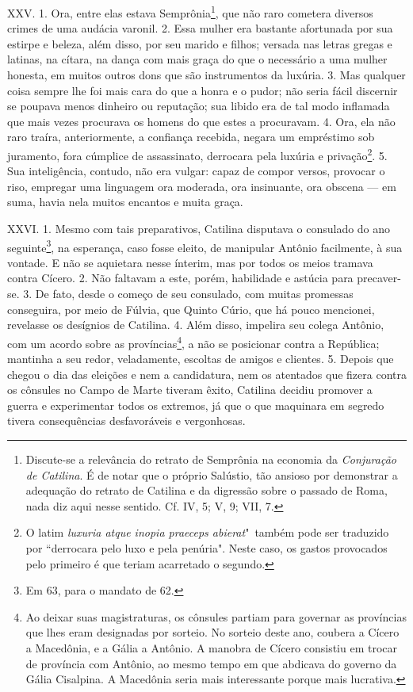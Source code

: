 XXV. 1. Ora, entre elas estava Semprônia\footnote{Discute-se a relevância do
retrato de Semprônia na economia da \emph{Conjuração de Catilina}. É de notar
que o próprio Salústio, tão ansioso por demonstrar a adequação do retrato de
Catilina e da digressão sobre o passado de Roma, nada diz aqui nesse sentido.
Cf. IV, 5; V, 9; VII, 7.}, que não raro cometera diversos crimes de uma audácia
varonil. 2. Essa mulher era bastante afortunada por sua estirpe e beleza, além
disso, por seu marido e filhos; versada nas letras gregas e latinas, na cítara,
na dança com mais graça do que o necessário a uma mulher honesta, em muitos
outros dons que são instrumentos da luxúria. 3. Mas qualquer coisa sempre lhe
foi mais cara do que a honra e o pudor; não seria fácil discernir se poupava
menos dinheiro ou reputação; sua libido era de tal modo inflamada que mais
vezes procurava os homens do que estes a procuravam. 4. Ora, ela não raro
traíra, anteriormente, a confiança recebida, negara um empréstimo sob
juramento, fora cúmplice de assassinato, derrocara pela luxúria e privação\footnote{O latim \emph{luxuria atque inopia praeceps abierat}"\ também pode ser traduzido por ``derrocara pelo luxo e pela penúria". Neste caso, os gastos provocados pelo primeiro é que teriam acarretado o segundo.}. 5. 
Sua inteligência, contudo, não era vulgar: capaz de compor versos, provocar o
riso, empregar uma linguagem ora moderada, ora insinuante, ora obscena --- em
suma, havia nela muitos encantos e muita graça.

XXVI. 1. Mesmo com tais preparativos, Catilina disputava o consulado do ano
seguinte\footnote{Em 63, para o mandato de 62.}, na esperança, caso fosse
eleito, de manipular Antônio facilmente, à sua vontade. E não se aquietara
nesse ínterim, mas por todos os meios tramava contra Cícero. 2. Não faltavam a
este, porém, habilidade e astúcia para precaver-se. 3. De fato, desde o começo
de seu consulado, com muitas promessas conseguira, por meio de Fúlvia, que
Quinto Cúrio, que há pouco mencionei, revelasse os desígnios de Catilina. 4.
Além disso, impelira seu colega Antônio, com um acordo sobre as
províncias\footnote{Ao deixar suas magistraturas, os cônsules partiam para
governar as províncias que lhes eram designadas por sorteio. No sorteio deste
ano, coubera a Cícero a Macedônia, e a Gália a Antônio. A manobra de Cícero
consistiu em trocar de província com Antônio, ao mesmo tempo em que abdicava do
governo da Gália Cisalpina. A Macedônia seria mais interessante porque mais
lucrativa.}, a não se posicionar contra a República; mantinha a seu redor,
veladamente, escoltas de amigos e clientes. 5. Depois que chegou o dia das
eleições e nem a candidatura, nem os atentados que fizera contra os cônsules no
Campo de Marte tiveram êxito, Catilina decidiu promover a guerra e experimentar
todos os extremos, já que o que maquinara em segredo tivera consequências
desfavoráveis e vergonhosas.

